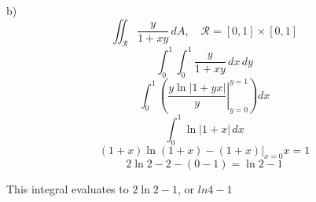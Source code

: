 \documentclass[hidelinks]{article}
\begin{document}
b)
\[
	\iint_{\mathcal{R}} \frac{y}{1+xy} \, dA, \quad \mathcal{R} = [0,1] \times [0,1]
\]
\[
	\int_0^1 \int_0^1 \frac{y}{1+xy} \,dx \, dy
\]
\[
	\int_0^1 \left(\left . \frac{y \ln|1+yx|}{y} \right |_{y = 0}^{y = 1}\right)dx
\]
\[
	\int_0^1 \ln|1+x| \,dx
\]
\[
	(1+x)\ln(1+x) - (1+x) \Big |_{x = 0 }{x = 1}
\]
\[
	2\ln2 - 2 - (0 - 1) = \ln2 -1
\]

This integral evaluates to $2\ln2 - 1$, or $ln4 - 1$
\end{document}
